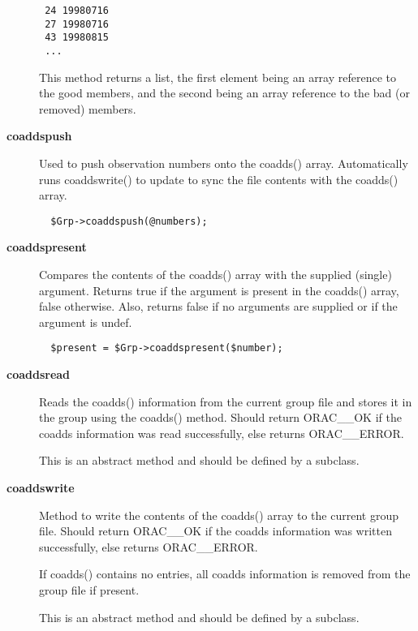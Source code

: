 \begin{description}
\begin{verbatim}
 24 19980716
 27 19980716
 43 19980815
 ...
\end{verbatim}


This method returns a list, the first element being an array reference
to the good members, and the second being an array reference to the
bad (or removed) members.


\item[{\textbf{coaddspush}}] \mbox{}

Used to push observation numbers onto the coadds() array. Automatically
runs coaddswrite() to update to sync the file contents with the coadds()
array.

\begin{verbatim}
  $Grp->coaddspush(@numbers);
\end{verbatim}

\item[{\textbf{coaddspresent}}] \mbox{}

Compares the contents of the coadds() array with the supplied (single)
argument. Returns true if the argument is present in the coadds()
array, false otherwise. Also, returns false if no arguments are supplied
or if the argument is undef.

\begin{verbatim}
  $present = $Grp->coaddspresent($number);
\end{verbatim}

\item[{\textbf{coaddsread}}] \mbox{}

Reads the coadds() information from the current group file and stores
it in the group using the coadds() method.
Should return ORAC\_\_OK if the coadds information was read successfully,
else returns ORAC\_\_ERROR.



This is an abstract method and should be defined by a subclass.


\item[{\textbf{coaddswrite}}] \mbox{}

Method to write the contents of the coadds() array to the current
group file. Should return ORAC\_\_OK if the coadds information was written
successfully, else returns ORAC\_\_ERROR.



If coadds() contains no entries, all coadds information is removed from
the group file if present.



This is an abstract method and should be defined by a subclass.



\end{description}
